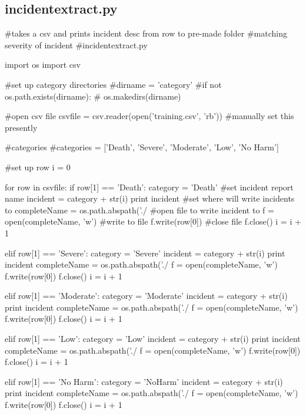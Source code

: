 \subsection{incidentextract.py}
\label{incidentextract.py}
\begin{pyverbatim}
#takes a csv and prints incident desc from row to pre-made folder
#matching severity of incident
#incidentextract.py

import os
import csv

#set up category directories
#dirname = 'category'
#if not os.path.exists(dirname):
#        os.makedirs(dirname)

#open csv file
csvfile = csv.reader(open('training.csv', 'rb')) #manually set this presently

#categories
#categories = ['Death', 'Severe', 'Moderate', 'Low', 'No Harm']

#set up row
i = 0

for row in csvfile:
        if row[1] == 'Death':
            category = 'Death' 
            #set incident report name 
            incident = category + str(i)
            print incident
            #set where will write incidents to
            completeName = os.path.abspath('./%
            #open file to write incident to
            f = open(completeName, 'w')
            #write to file
            f.write(row[0])
            #close file
            f.close()
            i = i + 1
        
        elif row[1] == 'Severe':
            category = 'Severe'
            incident = category + str(i)
            print incident
            completeName = os.path.abspath('./%
            f = open(completeName, 'w')
            f.write(row[0])
            f.close()
            i = i + 1

        elif row[1] == 'Moderate':
            category = 'Moderate'
            incident = category + str(i)
            print incident
            completeName = os.path.abspath('./%
            f = open(completeName, 'w')
            f.write(row[0])
            f.close()
            i = i + 1

        elif row[1] == 'Low':
            category = 'Low'
            incident = category + str(i)
            print incident
            completeName = os.path.abspath('./%
            f = open(completeName, 'w')
            f.write(row[0])
            f.close()
            i = i + 1

        elif row[1] == 'No Harm':
            category = 'NoHarm'
            incident = category + str(i)
            print incident
            completeName = os.path.abspath('./%
            f = open(completeName, 'w')
            f.write(row[0])
            f.close()
            i = i + 1
\end{pyverbatim}   

